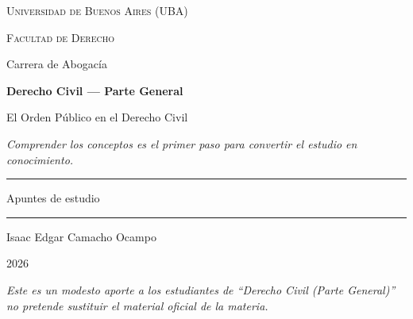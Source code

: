 \documentclass[12pt,oneside]{book}
\newcommand{\universidad}{Universidad de Buenos Aires (UBA)}
\newcommand{\facultad}{Facultad de Derecho}
\newcommand{\carrera}{Carrera de Abogacía}
\newcommand{\materia}{Derecho Civil — Parte General}
\newcommand{\titulo}{El Orden Público en el Derecho Civil}
\newcommand{\autor}{Isaac Edgar Camacho Ocampo}
\newcommand{\anio}{2026}
\begin{document}
\begin{titlepage}

\thispagestyle{empty}

\begin{center}

\vspace*{1cm}

{\large \textsc{\universidad}}

\vspace{0.2cm}

{\large \textsc{\facultad}}

\vspace{0.2cm}

{\large \carrera}

\vspace{3cm}

{\Huge \textbf{\materia}}

\vspace{1cm}

{\LARGE \titulo}

\vspace{0.8cm}

\textit{Comprender los conceptos es el primer paso para convertir el estudio en conocimiento.}

\vspace{1.2cm}

\rule{0.70\textwidth}{0.5pt}

\vspace{0.5cm}

{\large Apuntes de estudio}

\vspace{0.5cm}

\rule{0.70\textwidth}{0.5pt}

\vfill

{\large \autor}

\vspace{0.3cm}

{\large \anio}

\end{center}

\vfill

\begin{flushleft}
\textit{Este es un modesto aporte a los estudiantes de ``Derecho Civil (Parte General)'' no pretende sustituir el material oficial de la materia.}
\end{flushleft}

\end{titlepage}
\end{document}
